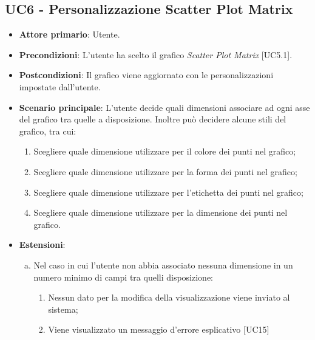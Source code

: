 \subsection{UC6 - Personalizzazione Scatter Plot Matrix}
\begin{itemize}
	\item \textbf{Attore primario}: Utente.
	
	\item \textbf{Precondizioni}: L'utente ha scelto il grafico \textit{Scatter Plot Matrix} [UC5.1].
	
	\item \textbf{Postcondizioni}: Il grafico viene aggiornato con le personalizzazioni impostate dall'utente.
	
	\item \textbf{Scenario principale}: L'utente decide quali dimensioni associare ad ogni asse del grafico tra quelle a disposizione. Inoltre può decidere alcune stili del grafico, tra cui:
		\begin{enumerate}
			\item Scegliere quale dimensione utilizzare per il colore dei punti nel grafico;
				
			\item Scegliere quale dimensione utilizzare per la forma dei punti nel grafico;
			
			\item Scegliere quale dimensione utilizzare per l'etichetta dei punti nel grafico;
			
			\item Scegliere quale dimensione utilizzare per la dimensione dei punti nel grafico.
				
		\end{enumerate}
		
	\item \textbf{Estensioni}:
	\begin{enumerate}[(a)]
		\item Nel caso in cui l'utente non abbia associato nessuna dimensione in un numero minimo di campi tra quelli disposizione:
		\begin{enumerate}
			\item Nessun dato per la modifica della visualizzazione viene inviato al sistema;
			\item Viene visualizzato un messaggio d'errore esplicativo [UC15]
		\end{enumerate}
	\end{enumerate}
\end{itemize}


